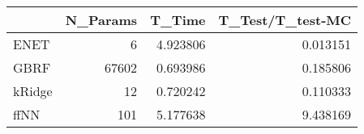 \begin{tabular}{lrrr}
\toprule
{} &  N\_Params &    T\_Time &  T\_Test/T\_test-MC \\
\midrule
ENET   &         6 &  4.923806 &          0.013151 \\
GBRF   &     67602 &  0.693986 &          0.185806 \\
kRidge &        12 &  0.720242 &          0.110333 \\
ffNN   &       101 &  5.177638 &          9.438169 \\
\bottomrule
\end{tabular}
